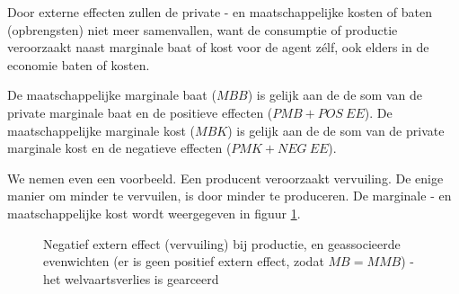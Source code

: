 \par Door externe effecten zullen de private - en maatschappelijke kosten of baten (opbrengsten) niet meer samenvallen, want de consumptie of productie veroorzaakt naast marginale baat of kost voor de agent z\'elf, ook elders in de economie baten of kosten. 
\par De maatschappelijke marginale baat ($MBB$) is gelijk aan de de som van de private marginale baat en de positieve effecten ($PMB+POS\ EE$). De maatschappelijke marginale kost ($MBK$) is gelijk aan de de som van de private marginale kost en de negatieve effecten ($PMK+NEG\ EE$). \\

\par We nemen even een voorbeeld. Een producent veroorzaakt vervuiling. De enige manier om minder te vervuilen, is door minder te produceren. De marginale - en maatschappelijke kost wordt weergegeven in figuur \ref{fig:h4-exteff}.

\begin{figure}[H]
\centering
\captionsetup{justification=centering,margin=2cm}
\caption{Negatief extern effect (vervuiling) bij productie, en geassocieerde evenwichten (er is geen positief extern effect, zodat $MB=MMB$) - het welvaartsverlies is gearceerd}
\label{fig:h4-exteff}
\end{figure}

